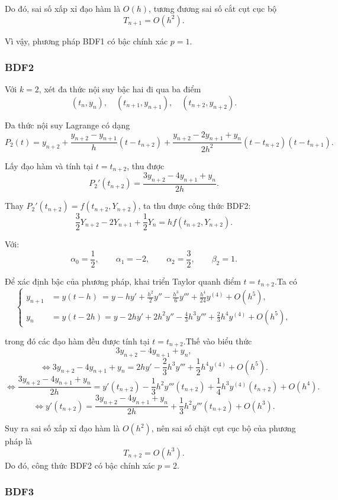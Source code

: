Do đó, sai số xấp xỉ đạo hàm là $O(h)$, tương đương sai số cắt cụt cục bộ
\[
T_{n+1}=O(h^2).
\]

Vì vậy, phương pháp BDF1 có bậc chính xác $\boxed{p=1.}$

\subsubsection{BDF2}

Với $k=2$, xét đa thức nội suy bậc hai đi qua ba điểm
\[
(t_n,y_n),\quad (t_{n+1},y_{n+1}),\quad (t_{n+2},y_{n+2}).
\]

Đa thức nội suy Lagrange có dạng
\[
P_2(t)
=
y_{n+2}
+\frac{y_{n+2}-y_{n+1}}{h}(t-t_{n+2})
+\frac{y_{n+2}-2y_{n+1}+y_n}{2h^2}
(t-t_{n+2})(t-t_{n+1}).
\]

Lấy đạo hàm và tính tại $t=t_{n+2}$, thu được
\[
P_2'(t_{n+2})
=
\frac{3y_{n+2}-4y_{n+1}+y_n}{2h}.
\]

Thay $P_2'(t_{n+2}) = f(t_{n+2},Y_{n+2})$, ta thu được công thức BDF2:
\[
\frac{3}{2}Y_{n+2}
-2Y_{n+1}
+\frac12 Y_n
=
hf(t_{n+2},Y_{n+2}).
\]

Với:
\[
\alpha_0=\frac12,\qquad
\alpha_1=-2,\qquad
\alpha_2=\frac32,\qquad
\beta_2=1.
\]

Để xác định bậc của phương pháp, khai triển Taylor quanh điểm
$t=t_{n+2}$.Ta có
\[
\left\{
\begin{aligned}
y_{n+1} &=y(t-h) \ =y-hy'+\frac{h^2}{2}y''-\frac{h^3}{6}y'''+\frac{h^4}{24}y^{(4)}
+O(h^5),\\
y_n &= y(t-2h) =y-2hy'+2h^2y''-\frac{4}{3}h^3y'''+\frac{2}{3}h^4y^{(4)}+O(h^5),
\end{aligned}
\right.
\]

trong đó các đạo hàm đều được tính tại $t=t_{n+2}$.Thế vào biểu thức
\[
3y_{n+2}-4y_{n+1}+y_n,
\]
\[
\Leftrightarrow 3y_{n+2}-4y_{n+1}+y_n=2hy'-\frac23h^3y'''+\frac12h^4y^{(4)}+O(h^5).
\]
\[
\Leftrightarrow \frac{3y_{n+2}-4y_{n+1}+y_n}{2h}=y'(t_{n+2})-\frac13h^2y'''(t_{n+2})+\frac14h^3y^{(4)}(t_{n+2})+O(h^4).
\]
\[
\Leftrightarrow y'(t_{n+2})=\frac{3y_{n+2}-4y_{n+1}+y_n}{2h}+\frac13h^2y'''(t_{n+2})+O(h^3).
\]

Suy ra sai số xấp xỉ đạo hàm là $O(h^2)$, nên sai số chặt cụt cục bộ của phương pháp là
\[
T_{n+2}=O(h^3).
\]
Do đó, công thức BDF2 có bậc chính xác $\boxed{p=2.}$

\subsubsection{BDF3}

